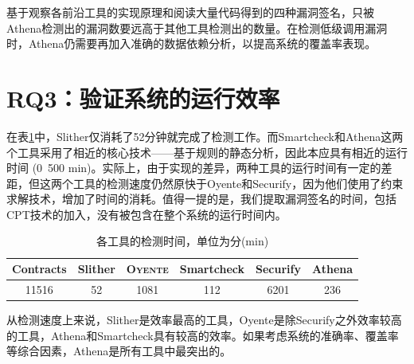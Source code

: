 基于观察各前沿工具的实现原理和阅读大量代码得到的四种漏洞签名，只被Athena检测出的漏洞数要远高于其他工具检测出的数量。在检测低级调用漏洞时，Athena仍需要再加入准确的数据依赖分析，以提高系统的覆盖率表现。

\section{RQ3：验证系统的运行效率}

在表\ref{tab:time_cost}中，Slither仅消耗了52分钟就完成了检测工作。而Smartcheck和Athena这两个工具采用了相近的核心技术——基于规则的静态分析，因此本应具有相近的运行时间 (0~500 min)。实际上，由于实现的差异，两种工具的运行时间有一定的差距，但这两个工具的检测速度仍然原快于Oyente和Securify，因为他们使用了约束求解技术，增加了时间的消耗。值得一提的是，我们提取漏洞签名的时间，包括CPT技术的加入，没有被包含在整个系统的运行时间内。

\begin{table}
  \centering
  \caption{各工具的检测时间，单位为分(min)}
  \begin{tabular}{cccccc}
    \toprule
    Contracts & Slither & \textsc{Oyente} & Smartcheck & Securify & Athena \\
    \midrule
    11516 & 52 & 1081 & 112 & 6201 & 236 \\
    \bottomrule
  \end{tabular}
  \label{tab:time_cost}
\end{table}

从检测速度上来说，Slither是效率最高的工具，Oyente是除Securify之外效率较高的工具，Athena和Smartcheck具有较高的效率。如果考虑系统的准确率、覆盖率等综合因素，Athena是所有工具中最突出的。